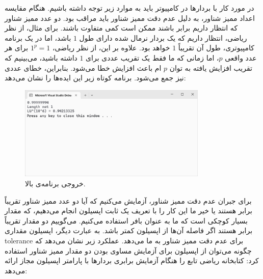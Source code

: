 {
    \Large
    \begin{spacing}{1.5}
        در مورد کار با بردارها در کامپیوتر باید به موارد زیر توجه داشته باشیم.
        هنگام مقایسه اعداد ممیز شناور، به دلیل عدم دقت ممیز شناور باید مراقب بود.
        دو عدد ممیز شناور که انتظار داریم برابر باشند ممکن است کمی متفاوت باشند.
        برای مثال، از نظر ریاضی، انتظار داریم که یک بردار نرمال شده دارای طول $1$ باشد، اما در یک برنامه کامپیوتری، طول آن تقریباً $1$ خواهد بود.
        علاوه بر این، از نظر ریاضی، $1^p=1$ برای هر عدد واقعی $p$، اما زمانی که ما فقط یک تقریب عددی برای $1$ داشته باشید، می‌بینیم که تقریب افزایش یافته به توان $p$ ام باعث افزایش خطا می‌شود.
        بنابراین، خطای عددی نیز جمع می‌شود. برنامه کوتاه زیر این ایده‌ها را نشان می‌دهد:
        \textbf{\vspace{6pt}}
        \lr{}
        \textbf{\vspace{-30pt}}
        \begin{figure}[H]
            \centering
            \setlength{\belowcaptionskip}{-10pt}
            \includegraphics[width=0.8\textwidth]{Images/4/1/4.Session.1.1.20}
            \caption {خروجی برنامه‌ی بالا.}
            \label{fig:4.Session.1.1.20}
        \end{figure}

        برای جبران عدم دقت ممیز شناور، آزمایش می‌کنیم که آیا دو عدد ممیز شناور تقریباً برابر هستند یا خیر
        ما این کار را با تعریف یک ثابت اپسیلون انجام می‌دهیم، که مقدار بسیار کوچکی است که ما به عنوان بافر استفاده می‌کنیم.
        می‌گوییم دو مقدار تقریباً برابر هستند اگر فاصله آن‌ها از اپسیلون کمتر باشد.
        به عبارت دیگر، اپسیلون مقداری tolerance برای عدم دقت ممیز شناور به ما می‌دهد.
        عملکرد زیر نشان می‌دهد که چگونه می‌توان از اپسیلون برای آزمایش مساوی بودن دو مقدار ممیز شناور استفاده کرد:
        \textbf{\vspace{6pt}}
        \lr{}
        \textbf{\vspace{6pt}}
        کتابخانه ریاضی  تابع  را هنگام آزمایش برابری بردارها با پارامتر اپسیلون  مجاز ارائه می‌دهد:
        \textbf{\vspace{6pt}}
        \lr{}
    \end{spacing}
}
\newpage


